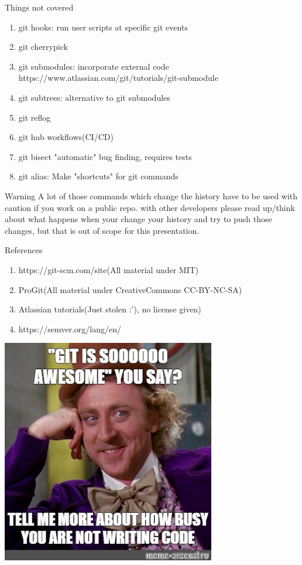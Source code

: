 \documentclass{beamer}
\begin{document}
\begin{frame}[fragile,t]{Things not covered}\vspace{10pt}
  \begin{enumerate}
    \item git hooks: run user scripts at specific git events
    \item git cherrypick
    \item git submodules: incorporate external code https://www.atlassian.com/git/tutorials/git-submodule
    \item git subtrees: alternative to git submodules
    \item git reflog
    \item git hub workflows(CI/CD)
    \item git bisect  "automatic" bug finding, requires tests
    \item git alias: Make "shortcuts" for git commands
  \end{enumerate}
\end{frame}


\begin{frame}[fragile,t]{Warning}\vspace{10pt}
  A lot of those commands which change the history have to be used with caution if you work on a public repo. with other developers please read up/think about what happens when your change your history and try to push those changes, but that is out of scope for this presentation.

\end{frame}

\begin{frame}[fragile,t]{References}\vspace{10pt}
  \begin{enumerate}
    \item https://git-scm.com/site(All material under MIT)
    \item ProGit(All material under CreativeCommons CC-BY-NC-SA)
    \item Atlassian tutorials(Just stolen :'), no license given)
    \item https://semver.org/lang/en/
  \end{enumerate}
\end{frame}

\begin{frame}
  \centering
      \includegraphics[width=0.7\textwidth,height=0.7\textheight]{memes/git_awesome.jpg}
\end{frame}
\end{document}
